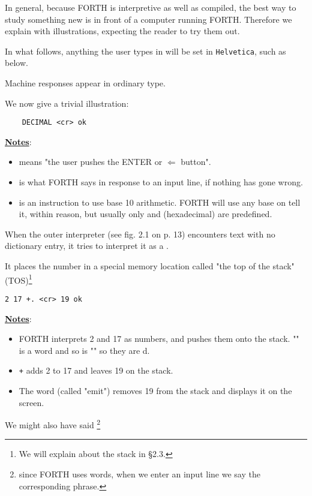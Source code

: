 In general, because FORTH is interpretive as well as compiled, the best way to study something new is in front of a computer running FORTH. Therefore we explain with illustrations, expecting the reader to try them out.

In what follows, anything the user types in will be set in \lstinline$Helvetica$, such as  below.

Machine responses appear in ordinary type.

We now give a trivial illustration:

\begin{lstlisting}
    DECIMAL <cr> ok
\end{lstlisting}

\underline{\textbf{Notes}}:
\begin{itemize}
  \item {} means "the user pushes the ENTER or $\Leftarrow$ button".
  \item {} is what FORTH says in response to an input line, if nothing has gone wrong.
  \item {} is an instruction to use base 10 arithmetic. FORTH will use any base on tell it, within reason, but usually only  and  (hexadecimal) are predefined.
\end{itemize}

When the outer interpreter (see fig. 2.1 on p. 13) encounters text with no dictionary entry, it tries to interpret it as a .

It places the number in a special memory location called "the top of the stack" (TOS)\footnote{We will explain about the stack in §2.3.}
\begin{lstlisting}
2 17 +. <cr> 19 ok
\end{lstlisting}

\underline{\textbf{Notes}}:
\begin{itemize}
  \item FORTH interprets 2 and 17 as numbers, and pushes them onto the stack. "\bc{+}" is a word and so is "" so they are d.
  \item \lstinline$+$ adds 2 to 17 and leaves 19 on the stack.
  \item The word  (called "emit") removes 19 from the stack and displays it on the screen.
\end{itemize}

We might also have said \footnote{since FORTH uses words, when we enter an input line we say the corresponding phrase.}

